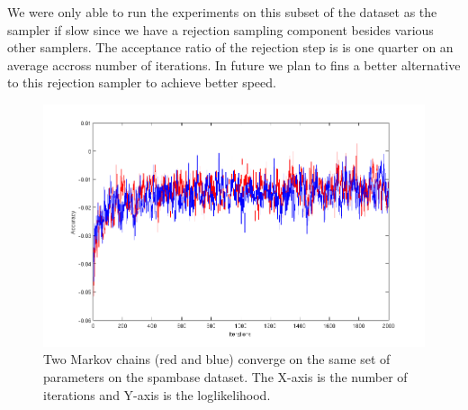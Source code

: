 We were only able to run the experiments on this subset of the dataset as the
sampler if slow since we have a rejection sampling component besides various
other samplers. The acceptance ratio of the rejection step is is one quarter on
an average accross number of iterations. In future we plan to fins a better
alternative to this rejection sampler to achieve better speed. 

\begin{figure}[hbt]
\includegraphics[width=1\textwidth]{results/KSsampleChain.png}
\caption{Two Markov chains (red and blue) converge on the same set of
parameters on the spambase dataset. The
X-axis is the number of iterations and Y-axis is the loglikelihood.}
\label{fig:MCMCconverge}
\end{figure}
